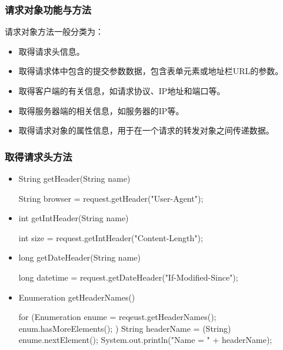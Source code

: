 \begin{frame}[fragile] %
\frametitle{请求对象功能与方法} 

请求对象方法一般分类为：
\begin{itemize}
\item 取得请求头信息。
\item 取得请求体中包含的提交参数数据，包含表单元素或地址栏URL的参数。
\item 取得客户端的有关信息，如请求协议、IP地址和端口等。
\item 取得服务器端的相关信息，如服务器的IP等。
\item 取得请求对象的属性信息，用于在一个请求的转发对象之间传递数据。
\end{itemize}
\end{frame}

\begin{frame}[fragile] %
\frametitle{取得请求头方法} 

\begin{itemize}
\item String getHeader(String name)
\begin{javaCode}
String browser = request.getHeader("User-Agent");
\end{javaCode}

\item int getIntHeader(String name)
\begin{javaCode}
int size = request.getIntHeader("Content-Length");
\end{javaCode}

\item long getDateHeader(String name)
\begin{javaCode}
long datetime = request.getDateHeader("If-Modified-Since");
\end{javaCode}

\item Enumeration getHeaderNames()
\begin{javaCode}
for (Enumeration enume = reqeust.getHeaderNames(); enum.hasMoreElements(); ) {
  String headerName = (String) enume.nextElement();
  System.out.println("Name = " + headerName);
}
\end{javaCode}
\end{itemize}
\end{frame}

